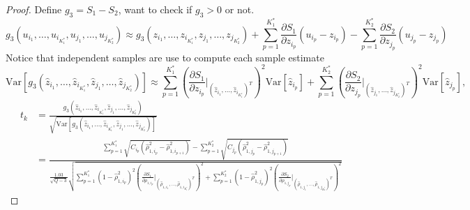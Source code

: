 \begin{proof}
Define $g_3 = S_1-S_2$, want to check if $g_3>0$ or not.
\[
g_3(u_{i_1},\ldots,u_{i_{K_1^*}},u_{j_1},\ldots,u_{j_{K_2^*}})\approx g_3(z_{i_1},\ldots,z_{i_{K_1^*}},z_{j_1},\ldots,z_{j_{K_2^*}})+\sum_{p=1}^{K_1^*} \frac{\partial S_1}{\partial z_{i_p}}(u_{i_p} - z_{i_p}) - \sum_{p=1}^{K_2^*} \frac{\partial S_2}{\partial z_{j_p}}(u_{j_p} - z_{j_p})
\]
Notice that independent samples are use to compute each sample estimate 
\[
\text{Var}\left[g_3(\widehat z_{i_1},\ldots,\widehat z_{i_{K_1^*}}, \widehat z_{j_1},\ldots, \widehat z_{j_{K_2^*}})\right] \approx \sum_{p=1}^{K_1^*} \left(\frac{\partial S_1}{\partial z_{i_p}}\Bigg\vert_{(\widehat z_{i_1},\ldots,\widehat z_{i_{K_1^*}})^T}\right)^2\text{Var}\left[\widehat  z_{i_p}\right] + \sum_{p=1}^{K_2^*} \left(\frac{\partial S_2}{\partial z_{j_p}}\Bigg\vert_{(\widehat z_{j_1},\ldots,\widehat z_{j_{K_2^*}})^T}\right)^2\text{Var}\left[\widehat z_{j_p}\right],
\]
%
\begin{align}\label{eq:cost_decrease_t_test}
    t_k &= \frac{g_3(\widehat z_{i_1},\ldots,\widehat z_{i_{K_1^*}}, \widehat z_{j_1},\ldots, \widehat z_{j_{K_2^*}})}{\sqrt{\text{Var}\left[g_3(\widehat z_{i_1},\ldots,\widehat z_{i_{K_1^*}}, \widehat z_{j_1},\ldots, \widehat z_{j_{K_2^*}})\right] }}\\
    &= \frac{\sum_{p=1}^{K_1^*}\sqrt{C_{i_p}(\widehat \rho_{1,i_p}^2-\widehat\rho_{1,i_{p+1}}^2)} - \sum_{p=1}^{K_2^*}\sqrt{C_{j_p}(\widehat \rho_{1,j_p}^2-\widehat\rho_{1,j_{p+1}}^2)}}{\frac{1.03}{\sqrt{Q-3}}\sqrt{\sum_{p=1}^{K_1^*} (1- \widehat \rho_{1,i_p}^2)^2\left(\frac{\partial S_1}{\partial \rho_{1,i_p}}\big\vert_{(\widehat \rho_{1,i_1},\ldots,\widehat \rho_{1,i_{K_1^*}})^T}\right)^2 + \sum_{p=1}^{K_2^*} (1- \widehat \rho_{1,j_p}^2)^2\left(\frac{\partial S_2}{\partial \rho_{1,j_p}}\big\vert_{(\widehat \rho_{1,j_1},\ldots,\widehat \rho_{1,j_{K_2^*}})^T}\right)^2}}
\end{align}
%

\end{proof}
